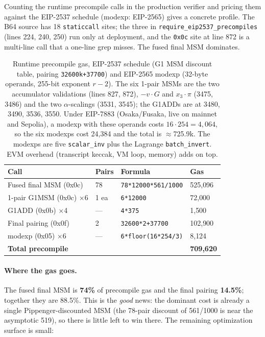 Counting the runtime precompile calls in the production verifier and
pricing them against the EIP-2537 schedule (modexp: EIP-2565) gives a
concrete profile. The B64 source has 18 \texttt{staticcall} sites; the
three in \texttt{require\_\allowbreak{}eip2537\_\allowbreak{}precompiles} (lines 224, 240, 250)
run only at deployment, and the \texttt{0x0c} site at line 872 is a
multi-line call that a one-line grep misses. The fused final MSM
dominates.

\begin{table}[h]
\centering\footnotesize
\begin{tabular}{@{}p{8.4em}p{3.4em}p{8.2em}p{4.6em}@{}}
\toprule
\textbf{Call} & \textbf{Pairs} & \textbf{Formula} & \textbf{Gas} \\
\midrule
Fused final MSM (0x0c) & 78 & \texttt{78*12000*\allowbreak{}561/1000} & 525{,}096 \\
1-pair G1MSM (0x0c) $\times$6 & 1 ea & \texttt{6*12000} & 72{,}000 \\
G1ADD (0x0b) $\times$4 & --- & \texttt{4*375} & 1{,}500 \\
Final pairing (0x0f) & 2 & \texttt{32600*2+\allowbreak{}37700} & 102{,}900 \\
modexp (0x05) $\times$6 & --- & \texttt{6*\allowbreak{}floor(16*254/3)} & 8{,}124 \\
\midrule
\textbf{Total precompile} & & & \textbf{709{,}620} \\
\bottomrule
\end{tabular}
\caption{Runtime precompile gas, EIP-2537 schedule (G1 MSM discount
table, pairing \texttt{32600k+37700}) and EIP-2565 modexp (32-byte
operands, 255-bit exponent $r-2$). The six 1-pair MSMs are the two
accumulator validations (lines 827, 872), $-v\cdot G$ and $x_3\cdot\pi$
(3475, 3486) and the two $\alpha$-scalings (3531, 3545); the G1ADDs are at
3480, 3490, 3536, 3550. Under EIP-7883 (Osaka/Fusaka, live on mainnet and Sepolia), a modexp with these operands
costs $16\cdot254=4{,}064$, so the six modexps cost 24{,}384 and the total is
$\approx$725.9k. The modexps are five \texttt{scalar\_inv} plus the
Lagrange \texttt{batch\_invert}. EVM overhead (transcript keccak, VM
loop, memory) adds on top.}
\label{tab:gas-profile}
\end{table}

\paragraph{Where the gas goes.} The fused final MSM is
\textbf{74\%} of precompile gas and the final pairing \textbf{14.5\%};
together they are 88.5\%. This is the \emph{good} news: the dominant
cost is already a single Pippenger-discounted MSM (the 78-pair
discount of 561/1000 is near the asymptotic 519), so there is little
left to win there. The remaining optimization surface is small:

